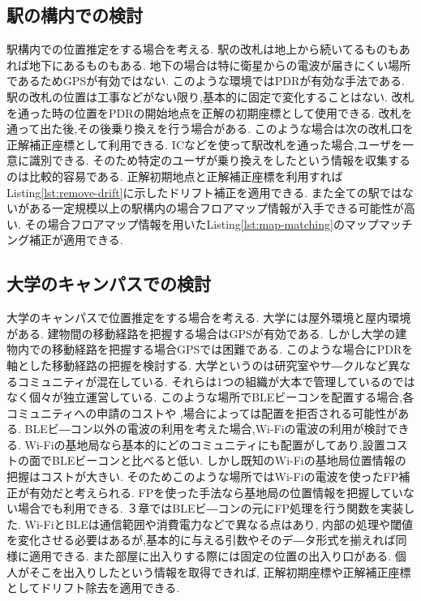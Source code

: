 \subsection{駅の構内での検討}
駅構内での位置推定をする場合を考える.
駅の改札は地上から続いてるものもあれば地下にあるものもある.
地下の場合は特に衛星からの電波が届きにくい場所であるためGPSが有効ではない.
このような環境ではPDRが有効な手法である.
駅の改札の位置は工事などがない限り,基本的に固定で変化することはない.
改札を通った時の位置をPDRの開始地点を正解の初期座標として使用できる.
改札を通って出た後,その後乗り換えを行う場合がある.
このような場合は次の改札口を正解補正座標として利用できる.
ICなどを使って駅改札を通った場合,ユーザを一意に識別できる.
そのため特定のユーザが乗り換えをしたという情報を収集するのは比較的容易である.
正解初期地点と正解補正座標を利用すればListing\ref{lst:remove-drift}に示したドリフト補正を適用できる.
また全ての駅ではないがある一定規模以上の駅構内の場合フロアマップ情報が入手できる可能性が高い.
その場合フロアマップ情報を用いたListing\ref{lst:map-matching}のマップマッチング補正が適用できる.

\subsection{大学のキャンパスでの検討}
大学のキャンパスで位置推定をする場合を考える.
大学には屋外環境と屋内環境がある.
建物間の移動経路を把握する場合はGPSが有効である.
しかし大学の建物内での移動経路を把握する場合GPSでは困難である.
このような場合にPDRを軸とした移動経路の把握を検討する.
大学というのは研究室やサ―クルなど異なるコミュニティが混在している.
それらは1つの組織が大本で管理しているのではなく個々が独立運営している.
このような場所でBLEビーコンを配置する場合,各コミュニティへの申請のコストや
,場合によっては配置を拒否される可能性がある.
BLEビ―コン以外の電波の利用を考えた場合,Wi-Fiの電波の利用が検討できる.
Wi-Fiの基地局なら基本的にどのコミュニティにも配置がしてあり,設置コストの面でBLEビーコンと比べると低い.
しかし既知のWi-Fiの基地局位置情報の把握はコストが大きい.
そのためこのような場所ではWi-Fiの電波を使ったFP補正が有効だと考えられる.
FPを使った手法なら基地局の位置情報を把握していない場合でも利用できる.
３章ではBLEビ―コンの元にFP処理を行う関数を実装した.
Wi-FiとBLEは通信範囲や消費電力などで異なる点はあり,
内部の処理や閾値を変化させる必要はあるが,基本的に与える引数やそのデ―タ形式を揃えれば同様に適用できる.
また部屋に出入りする際には固定の位置の出入り口がある.
個人がそこを出入りしたという情報を取得できれば,
正解初期座標や正解補正座標としてドリフト除去を適用できる.
